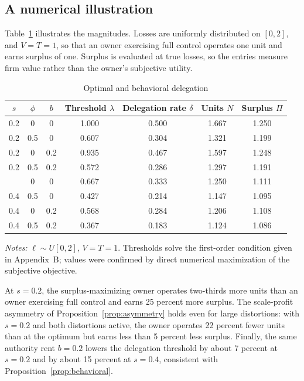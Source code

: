 \documentclass[11pt,a4paper]{article}
\theoremstyle{plain}
\begin{document}
\subsection{A numerical illustration}

Table~\ref{tab:illustration} illustrates the magnitudes. Losses are uniformly distributed on $[0, 2]$, and $V = T = 1$, so that an owner exercising full control operates one unit and earns surplus of one. Surplus is evaluated at true losses, so the entries measure firm value rather than the owner's subjective utility.

\begin{table}[ht]
\centering
\caption{Optimal and behavioral delegation}\label{tab:illustration}
\begin{tabular}{ccccccc}
\toprule
$s$ & $\phi$ & $b$ & Threshold $\lambda$ & Delegation rate $\delta$ & Units $N$ & Surplus $\Pi$ \\
\midrule
0.2 & 0   & 0   & 1.000 & 0.500 & 1.667 & 1.250 \\
0.2 & 0.5 & 0   & 0.607 & 0.304 & 1.321 & 1.199 \\
0.2 & 0   & 0.2 & 0.935 & 0.467 & 1.597 & 1.248 \\
0.2 & 0.5 & 0.2 & 0.572 & 0.286 & 1.297 & 1.191 \\
\addlinespace
0.4 & 0   & 0   & 0.667 & 0.333 & 1.250 & 1.111 \\
0.4 & 0.5 & 0   & 0.427 & 0.214 & 1.147 & 1.095 \\
0.4 & 0   & 0.2 & 0.568 & 0.284 & 1.206 & 1.108 \\
0.4 & 0.5 & 0.2 & 0.367 & 0.183 & 1.124 & 1.086 \\
\bottomrule
\end{tabular}

\smallskip
\begin{minipage}{0.92\textwidth}
\footnotesize\emph{Notes:} $\ell \sim U[0, 2]$, $V = T = 1$. Thresholds solve the first-order condition given in Appendix~B; values were confirmed by direct numerical maximization of the subjective objective.
\end{minipage}
\end{table}

At $s = 0.2$, the surplus-maximizing owner operates two-thirds more units than an owner exercising full control and earns 25 percent more surplus. The scale-profit asymmetry of Proposition~\ref{prop:asymmetry} holds even for large distortions: with $s = 0.2$ and both distortions active, the owner operates 22 percent fewer units than at the optimum but earns less than 5 percent less surplus. Finally, the same authority rent $b = 0.2$ lowers the delegation threshold by about 7 percent at $s = 0.2$ and by about 15 percent at $s = 0.4$, consistent with Proposition~\ref{prop:behavioral}.
\end{document}
